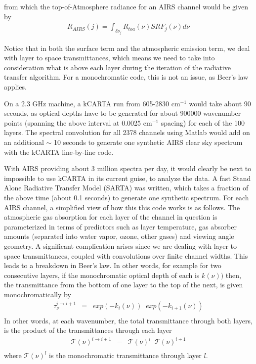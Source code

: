 \documentclass[11pt]{article}
\newcommand{\kc}{\textsf{kCARTA}\xspace}
\newcommand{\wn}{cm$^{-1}$\xspace}
\begin{document}
from which the top-of-Atmosphere radiance for an AIRS channel would be given by
\begin{eqnarray*}
  R_{AIRS}(j) = \int_{\delta \nu_{j}} R_{toa}(\nu) SRF_{j}(\nu) d\nu
\end{eqnarray*}

Notice that in both the surface term and the atmospheric emission term, we deal with layer to 
space transmittances, which means we need to take into consideration what is above each layer during 
the iteration of the radiative transfer algorithm. For a monochromatic code, this is not an issue, as 
Beer's law applies.

On a 2.3 GHz machine, a \kc run from 605-2830 \wn would take about 90 seconds, as optical depths have to be 
generated for about 900000 wavenumber points (spanning the above interval at 0.0025 \wn spacing) for each 
of the 100 layers. The spectral convolution for all 2378 channels using Matlab would add on an additional 
$\sim$ 10 seconds to generate one synthetic AIRS clear sky spectrum with the \kc line-by-line code.

With AIRS providing about 3 million spectra per day, it would clearly be next to impossible to use \kc 
in its current guise, to analyze the data. A fast Stand Alone Radiative Transfer Model (SARTA) was written,
which 
takes a fraction of the above time (about 0.1 seconds) to generate one synthetic spectrum. For each AIRS
channel, a simplified view of how this this code works is as follows. The atmospheric gas absorption for  
each layer of the channel in question is parameterized in terms of predictors such as layer temperature, 
gas absorber amounts (separated into water vapor, ozone, other gases) and viewing angle geometry. A significant
complication arises since we are dealing with layer to space transmittances, coupled with convolutions over
finite channel widths. This leads to a breakdown in Beer's law. In other words, for example for two 
consecutive layers, if the monochromatic optical depth of each is $k(\nu))$ then, the transmittance from the 
bottom of one layer to the top of the next, is given monochromatically by
\begin{eqnarray*}
  \tau_{\nu}^{i \rightarrow i+1} & = & exp(-k_{i}(\nu)) \;\; exp(-k_{i+1}(\nu)) \\
\end{eqnarray*}
In other words, at each wavenumber, the total transmittance through both layers, is the product of the 
transmittances through each layer
\begin{eqnarray*}
  \mathcal{T}(\nu)^{i \rightarrow i+1}           & = &  \mathcal{T}(\nu)^{i} \;\;  \mathcal{T}(\nu)^{i+1}\\
\end{eqnarray*}
where $\mathcal{T}(\nu)^{l}$ is the monochromatic transmittance through layer $l$. 
\end{document}

